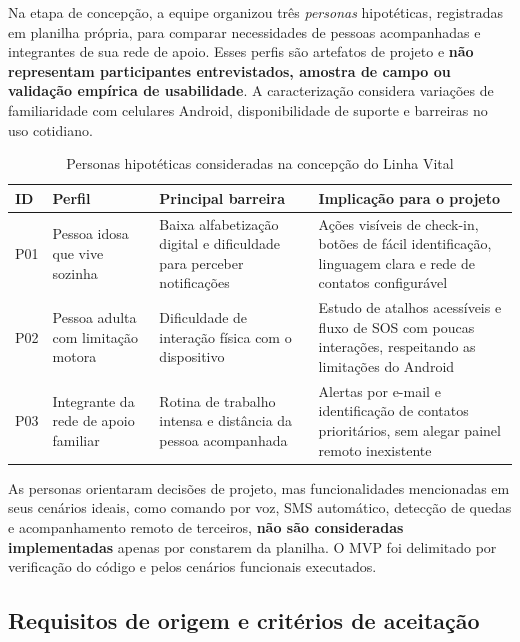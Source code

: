 Na etapa de concepção, a equipe organizou três \emph{personas} hipotéticas, registradas em planilha própria, para comparar necessidades de pessoas acompanhadas e integrantes de sua rede de apoio. Esses perfis são artefatos de projeto e \textbf{não representam participantes entrevistados, amostra de campo ou validação empírica de usabilidade}. A caracterização considera variações de familiaridade com celulares Android, disponibilidade de suporte e barreiras no uso cotidiano.

\begin{table}[H]
\caption{Personas hipotéticas consideradas na concepção do Linha Vital}
\label{tab_personas_2026}
\centering\footnotesize
\renewcommand{\arraystretch}{1.15}
\begin{tabular}{p{1.3cm}p{2.45cm}p{3.25cm}p{5.4cm}}\hline
\textbf{ID} & \textbf{Perfil} & \textbf{Principal barreira} & \textbf{Implicação para o projeto}\\\hline
P01 & Pessoa idosa que vive sozinha & Baixa alfabetização digital e dificuldade para perceber notificações & Ações visíveis de check-in, botões de fácil identificação, linguagem clara e rede de contatos configurável \\\hline
P02 & Pessoa adulta com limitação motora & Dificuldade de interação física com o dispositivo & Estudo de atalhos acessíveis e fluxo de SOS com poucas interações, respeitando as limitações do Android \\\hline
P03 & Integrante da rede de apoio familiar & Rotina de trabalho intensa e distância da pessoa acompanhada & Alertas por e-mail e identificação de contatos prioritários, sem alegar painel remoto inexistente \\\hline
\end{tabular}
\end{table}

As personas orientaram decisões de projeto, mas funcionalidades mencionadas em seus cenários ideais, como comando por voz, SMS automático, detecção de quedas e acompanhamento remoto de terceiros, \textbf{não são consideradas implementadas} apenas por constarem da planilha. O MVP foi delimitado por verificação do código e pelos cenários funcionais executados.

\subsection{Requisitos de origem e critérios de aceitação}

